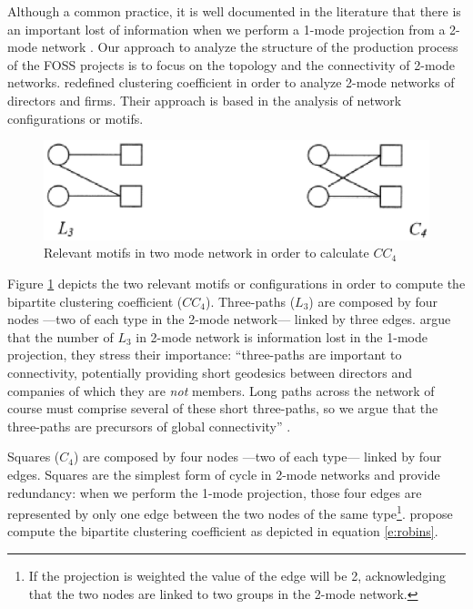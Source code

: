 Although a common practice, it is well documented in the literature that there is an important lost of information when we perform a 1-mode projection from a 2-mode network \citep[324-325]{wasserman:1994}. Our approach to analyze the structure of the production process of the FOSS projects is to focus on the topology and the connectivity of 2-mode networks. \citet{robins:2004} redefined clustering coefficient in order to analyze 2-mode networks of directors and firms. Their approach is based in the analysis of network configurations or motifs.

\begin{figure}[h]
\begin{center}
\includegraphics[scale=0.60]{figures/motifs}
\caption[Network motifs for bipartite networks.]{Relevant motifs in two mode network in order to calculate $CC_4$ \citep[78]{robins:2004}}
\label{fig:motifs}
\end{center}
\end{figure}

Figure \ref{fig:motifs} depicts the two relevant motifs or configurations in order to compute the bipartite clustering coefficient ($CC_4$). Three-paths ($L_3$) are composed by four nodes ---two of each type in the 2-mode network--- linked by three edges. \citeauthor{robins:2004} argue that the number of $L_3$ in 2-mode network is information lost in the 1-mode projection, they stress their importance: ``three-paths are important to connectivity, potentially providing short geodesics between directors and companies of which they are \emph{not} members. Long paths across the network of course must comprise several of these short three-paths, so we argue that the three-paths are precursors of global connectivity'' \citep[77-78]{robins:2004}.

Squares ($C_4$) are composed by four nodes ---two of each type--- linked by four edges. Squares are the simplest form of cycle in 2-mode networks and provide redundancy: when we perform the 1-mode projection, those four edges are represented by only one edge between the two nodes of the same type\footnote{If the projection is weighted the value of the edge will be 2, acknowledging that the two nodes are linked to two groups in the 2-mode network.}. \citet[79]{robins:2004} propose compute the bipartite clustering coefficient as depicted in equation \ref{e:robins}. 

